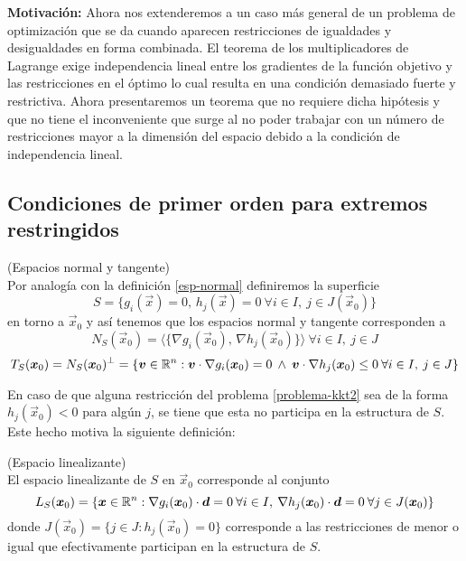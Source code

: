 \textbf{Motivaci\'on:} Ahora nos extenderemos a un caso m\'as general de un problema de optimizaci\'on que se da cuando aparecen restricciones de igualdades y desigualdades en forma combinada. El teorema de los multiplicadores de Lagrange exige independencia lineal entre los gradientes de la funci\'on objetivo y las restricciones en el \'optimo lo cual resulta en una condici\'on demasiado fuerte y restrictiva. Ahora presentaremos un teorema que no requiere dicha hip\'otesis y que no tiene el inconveniente que surge al no poder trabajar con un n\'umero de restricciones mayor a la dimensi\'on del espacio debido a la condici\'on de independencia lineal.


\subsection{Condiciones de primer orden para extremos restringidos}

\begin{definicion}{\rm (Espacios normal y tangente)}\label{superficie-kkt}
\\Por analog\'ia con la definici\'on \ref{esp-normal} definiremos la superficie
$$S= \{g_i (\vec{x}) = 0\text{, } h_j (\vec{x}) = 0 \: \forall i\in I ,\: j\in J(\vec{x}_0)\}$$
en torno a $\vec{x}_0$ y as\'i tenemos que los espacios normal y tangente corresponden a
$$N_S (\vec{x}_0) = \langle \{ \nabla g_i (\vec{x}_0)\text{, } \nabla h_j (\vec{x}_0) \} \rangle \: \forall i\in I ,\: j\in J$$
$$T_S (\boldsymbol{x}_0) = N_S (\boldsymbol{x}_0)^{\perp} = \{\boldsymbol{v}\in \mathbb{R}^n : \boldsymbol{v}\cdot \nabla g_i (\boldsymbol{x}_0) = 0 \:\wedge\: \boldsymbol{v}\cdot \nabla h_j (\boldsymbol{x}_0) \leq 0 \: \forall i\in I ,\: j \in J \}$$
\end{definicion}

En caso de que alguna restricci\'on del problema \eqref{problema-kkt2} sea de la forma $h_j(\vec{x}_0) < 0$ para alg\'un $j$, se tiene que esta no participa en la estructura de $S$. Este hecho motiva la siguiente definici\'on:

\begin{definicion}{\rm (Espacio linealizante)}
\\El espacio linealizante de $S$ en $\vec{x}_0$ corresponde al conjunto
$$L_S(\boldsymbol{x}_0) = \{\boldsymbol{x}\in \mathbb{R}^n : \nabla g_i(\boldsymbol{x}_0) \cdot \boldsymbol{d} = 0 \:\forall i\in I,\: \nabla h_j(\boldsymbol{x}_0) \cdot \boldsymbol{d} = 0 \:\forall j\in J(\boldsymbol{x}_0)\}$$
donde $J(\vec{x}_0)=\{j\in J : h_j(\vec{x}_0)=0\}$ corresponde a las restricciones de menor o igual que efectivamente participan en la estructura de $S$.
\end{definicion}

